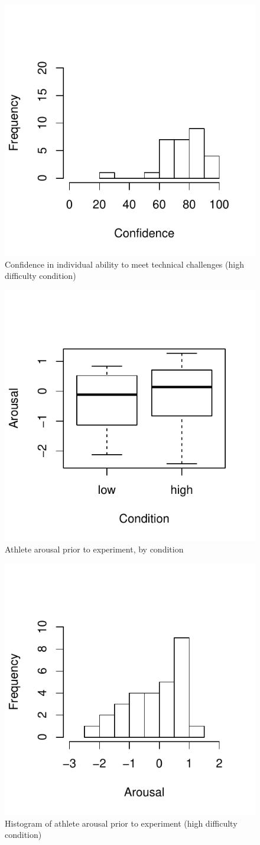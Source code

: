 \begin{figure}
  \centering
  \includegraphics[width=0.5\linewidth,keepaspectratio] {images/histLowIndConfidence-1}
  \caption{Confidence in individual ability to meet technical challenges (high difficulty condition)}
  \label{fig:histLowIndConfidence}
\end{figure}

\begin{figure}
  \centering
  \includegraphics[width=0.5\linewidth,keepaspectratio] {images/arousalFactorPreBoxPlot-1}
  \caption{Athlete arousal prior to experiment, by condition}
        \label{fig:arousalFactorPreBoxPlot}
    \end{figure}

\begin{figure}
  \centering
      \includegraphics[width=0.5\linewidth,keepaspectratio] {images/histArousalFactorPreHigh-1}
      \caption{Histogram of athlete arousal prior to experiment (high difficulty condition)}
        \label{fig:histArousalFactorPreHigh}
    \end{figure}

